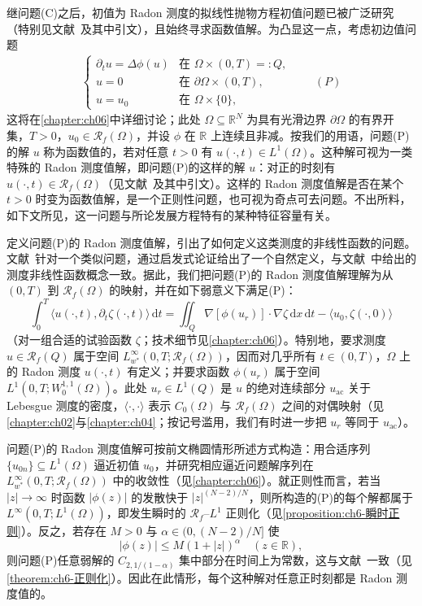 \documentclass[../main.tex]{subfiles}
\begin{document}
继问题(C)之后，初值为 Radon 测度的拟线性抛物方程初值问题已被广泛研究（特别见文献~\cite{ref16,ref26,ref35,ref36,ref81,ref104}及其中引文），且始终寻求函数值解。为凸显这一点，考虑初边值问题
\begin{align*}
\begin{cases}
\partial_t u = \Delta\phi(u) & \text{在 }\Omega\times(0,T)=:Q,\\
u=0 & \text{在 }\partial\Omega\times(0,T),\\
u=u_0 & \text{在 }\Omega\times\{0\},
\end{cases}
\qquad(P)
\end{align*}
这将在\cref{chapter:ch06}中详细讨论；此处 $\Omega\subseteq\mathbb{R}^N$ 为具有光滑边界 $\partial\Omega$ 的有界开集，$T>0$，$u_0\in\mathscr{R}_f(\Omega)$，并设 $\phi$ 在 $\mathbb{R}$ 上连续且非减。按我们的用语，问题(P)的解 $u$ 称为函数值的，若对任意 $t>0$ 有 $u(\cdot,t)\in L^1(\Omega)$。这种解可视为一类特殊的 Radon 测度值解，即问题(P)的这样的解 $u$：对正的时刻有 $u(\cdot,t)\in\mathscr{R}_f(\Omega)$（见文献~\cite{ref85,ref86,ref87}及其中引文）。这样的 Radon 测度值解是否在某个 $t>0$ 时变为函数值解，是一个正则性问题，也可视为奇点可去问题。不出所料，如下文所见，这一问题与所论发展方程特有的某种特征容量有关。

定义问题(P)的 Radon 测度值解，引出了如何定义这类测度的非线性函数的问题。文献~\cite{ref11}针对一个类似问题，通过启发式论证给出了一个自然定义，与文献~\cite{ref38,ref39}中给出的测度非线性函数概念一致。据此，我们把问题(P)的 Radon 测度值解理解为从 $(0,T)$ 到 $\mathscr{R}_f(\Omega)$ 的映射，并在如下弱意义下满足(P)：
\[
\int_0^T \langle u(\cdot,t),\partial_t\zeta(\cdot,t)\rangle\,\mathrm{d}t
= \iint_Q \nabla[\phi(u_r)]\cdot\nabla\zeta\,\mathrm{d}x\,\mathrm{d}t
- \langle u_0,\zeta(\cdot,0)\rangle
\]
（对一组合适的试验函数 $\zeta$；技术细节见\cref{chapter:ch06}）。特别地，要求测度 $u\in\mathscr{R}_f(Q)$ 属于空间 $L^\infty_{w^*}(0,T;\mathscr{R}_f(\Omega))$，因而对几乎所有 $t\in(0,T)$，$\Omega$ 上的 Radon 测度 $u(\cdot,t)$ 有定义；并要求函数 $\phi(u_r)$ 属于空间 $L^1(0,T;W^{1,1}_0(\Omega))$。此处 $u_r\in L^1(Q)$ 是 $u$ 的绝对连续部分 $u_{\mathrm{ac}}$ 关于 Lebesgue 测度的密度，$\langle\cdot,\cdot\rangle$ 表示 $C_0(\Omega)$ 与 $\mathscr{R}_f(\Omega)$ 之间的对偶映射（见\cref{chapter:ch02}与\cref{chapter:ch04}；按记号滥用，我们有时进一步把 $u_r$ 等同于 $u_{\mathrm{ac}}$）。

问题(P)的 Radon 测度值解可按前文椭圆情形所述方式构造：用合适序列 $\{u_{0n}\}\subseteq L^1(\Omega)$ 逼近初值 $u_0$，并研究相应逼近问题解序列在 $L^\infty_{w^*}(0,T;\mathscr{R}_f(\Omega))$ 中的收敛性（见\cref{chapter:ch06}）。就正则性而言，若当 $|z|\to\infty$ 时函数 $|\phi(z)|$ 的发散快于 $|z|^{(N-2)/N}$，则所构造的(P)的每个解都属于 $L^\infty(0,T;L^1(\Omega))$，即发生瞬时的 $\mathscr{R}_f$--$L^1$ 正则化（见\cref{proposition:ch6-瞬时正则}）。反之，若存在 $M>0$ 与 $\alpha\in(0,(N-2)/N]$ 使
\[
|\phi(z)| \leqslant M(1+|z|)^\alpha \quad (z\in\mathbb{R}),
\]
则问题(P)任意弱解的 $C_{2,1/(1-\alpha)}$ 集中部分在时间上为常数，这与文献~\cite{ref80}一致（见\cref{theorem:ch6-正则化}）。因此在此情形，每个这种解对任意正时刻都是 Radon 测度值的。
\end{document}

